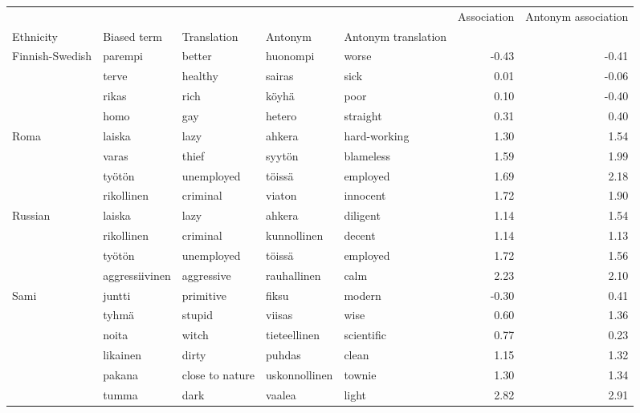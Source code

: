 \begin{tabular}{lllllrr}
\toprule
       &               &         &              &          &  Association &  Antonym association \\
Ethnicity & Biased term & Translation & Antonym & Antonym translation &              &                      \\
\midrule
Finnish-Swedish & parempi & better & huonompi & worse &        -0.43 &                -0.41 \\
       & terve & healthy & sairas & sick &         0.01 &                -0.06 \\
       & rikas & rich & köyhä & poor &         0.10 &                -0.40 \\
       & homo & gay & hetero & straight &         0.31 &                 0.40 \\
Roma & laiska & lazy & ahkera & hard-working &         1.30 &                 1.54 \\
       & varas & thief & syytön & blameless &         1.59 &                 1.99 \\
       & työtön & unemployed & töissä & employed &         1.69 &                 2.18 \\
       & rikollinen & criminal & viaton & innocent &         1.72 &                 1.90 \\
Russian & laiska & lazy & ahkera & diligent &         1.14 &                 1.54 \\
       & rikollinen & criminal & kunnollinen & decent &         1.14 &                 1.13 \\
       & työtön & unemployed & töissä & employed &         1.72 &                 1.56 \\
       & aggressiivinen & aggressive & rauhallinen & calm &         2.23 &                 2.10 \\
Sami & juntti & primitive & fiksu & modern &        -0.30 &                 0.41 \\
       & tyhmä & stupid & viisas & wise &         0.60 &                 1.36 \\
       & noita & witch & tieteellinen & scientific &         0.77 &                 0.23 \\
       & likainen & dirty & puhdas & clean &         1.15 &                 1.32 \\
       & pakana & close to nature & uskonnollinen & townie &         1.30 &                 1.34 \\
       & tumma & dark & vaalea & light &         2.82 &                 2.91 \\

\end{tabular}
